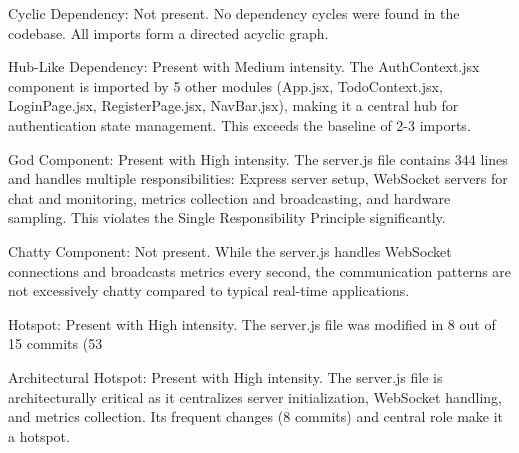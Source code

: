 Cyclic Dependency: Not present. No dependency cycles were found in the codebase. All imports form a directed acyclic graph.

Hub-Like Dependency: Present with Medium intensity. The AuthContext.jsx component is imported by 5 other modules (App.jsx, TodoContext.jsx, LoginPage.jsx, RegisterPage.jsx, NavBar.jsx), making it a central hub for authentication state management. This exceeds the baseline of 2-3 imports.

God Component: Present with High intensity. The server.js file contains 344 lines and handles multiple responsibilities: Express server setup, WebSocket servers for chat and monitoring, metrics collection and broadcasting, and hardware sampling. This violates the Single Responsibility Principle significantly.

Chatty Component: Not present. While the server.js handles WebSocket connections and broadcasts metrics every second, the communication patterns are not excessively chatty compared to typical real-time applications.

Hotspot: Present with High intensity. The server.js file was modified in 8 out of 15 commits (53%

Architectural Hotspot: Present with High intensity. The server.js file is architecturally critical as it centralizes server initialization, WebSocket handling, and metrics collection. Its frequent changes (8 commits) and central role make it a hotspot.